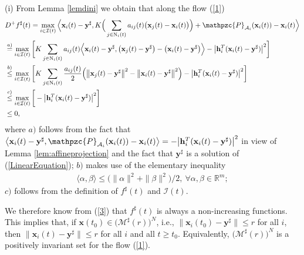 \documentclass[a4paper, 11pt]{article}
\begin{document}
\noindent (i) From Lemma \ref{lemdini} we obtain that along the flow (\ref{1})
\begin{align}\label{3}
&D^+f^\sharp(t)=\max_{i\in\mathcal{I}(t)} \Big\langle \mathbf{x}_i(t)-\mathbf{y}^\sharp,  K\Big( \sum_{j\in \mathrm{N}_i(t)}a_{ij}(t)\big(\mathbf{x}_j(t)-\mathbf{x}_i(t)\big) \Big) + \mathpzc{P}_{\mathcal{A}_i}(\mathbf{x}_i(t))-\mathbf{x}_i(t)\Big\rangle\nonumber\\
&\stackrel{a)}{=}\max_{i\in\mathcal{I}(t)}\bigg[ K \sum_{j\in \mathrm{N}_i(t)}a_{ij}(t) \Big\langle \mathbf{x}_i(t)-\mathbf{y}^\sharp, \big(\mathbf{x}_j(t)-\mathbf{y}^\sharp\big)-\big(\mathbf{x}_i(t)-\mathbf{y}^\sharp\big) \Big\rangle-\big|\mathbf{h}_i^T( \mathbf{x}_i(t)-\mathbf{y}^\sharp)\big|^2 \bigg]\nonumber\\
&\stackrel{b)}{\leq}  \max_{i\in\mathcal{I}(t)}\bigg[ K \sum_{j\in \mathrm{N}_i(t)}\frac{a_{ij}(t)}{2}  \Big(\big\|\mathbf{x}_j(t)-\mathbf{y}^\sharp\big\|^2 - \big\|\mathbf{x}_i(t)-\mathbf{y}^\sharp\big\|^2 \Big)-\big|\mathbf{h}_i^T( \mathbf{x}_i(t)-\mathbf{y}^\sharp)\big|^2 \bigg]\nonumber\\
&\stackrel{c)}{\leq}   \max_{i\in\mathcal{I}(t)} \bigg[-\big|\mathbf{h}_i^T( \mathbf{x}_i(t)-\mathbf{y}^\sharp)\big|^2 \bigg]\nonumber\\
&\leq 0,
\end{align}
where $a)$ follows from the fact that
$
\big\langle \mathbf{x}_i(t)-\mathbf{y}^\sharp, \mathpzc{P}_{\mathcal{A}_i}(\mathbf{x}_i(t))-\mathbf{x}_i(t)\big\rangle
=-\big|\mathbf{h}_i^T( \mathbf{x}_i(t)-\mathbf{y}^\sharp)\big|^2
$
in view of Lemma \ref{lem:affineprojection} and the fact that $\mathbf{y}^\sharp$ is a solution of (\ref{LinearEquation}); $b)$ makes use of the elementary inequality
\begin{align}\label{4}
\langle \alpha, \beta\rangle\leq \big(\|\alpha\|^2+ \|\beta\|^2\big)/2,\ \forall \alpha,\beta\in \mathbb{R}^m;
\end{align}
$c)$ follows from the definition of $f^\sharp(t)$ and $\mathcal{I}(t)$.

We therefore know from (\ref{3}) that $f^\sharp(t)$ is always a non-increasing functions. This implies that,  if $\mathbf{x}(t_0)\in\big(\mathcal{M}^\sharp(r)\big)^{N}$, i.e., $\big\|\mathbf{x}_i(t_0)-\mathbf{y}^\sharp\big\|\leq r$  for all $i$, then $\big\|\mathbf{x}_i(t)-\mathbf{y}^\sharp\big\|\leq r$  for all $i$ and all $t\geq t_0$. Equivalently,  $\big(\mathcal{M}^\sharp(r)\big)^{N}$ is a positively invariant set for the flow (\ref{1}).
\end{document}
